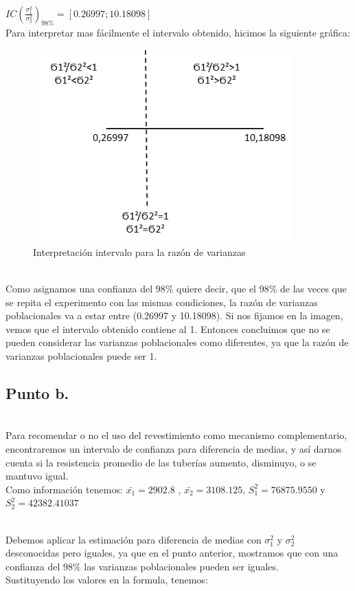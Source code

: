 \documentclass[letterpaper,12pt,onecolumn,titlepage]{article}
\begin{document}
~\\ $IC(\frac{\sigma_1^{2}}{\sigma_2^{2}})_{98\%}=[0.26997 ; 10.18098]$
~\\ Para interpretar mas f\'{a}cilmente el intervalo obtenido, hicimos la siguiente gr\'{a}fica:
\begin{figure}[!h]
    \begin{center}
        \includegraphics[width=10cm]{Figuras/Grafico4.png}
        \caption{Interpretaci\'{o}n intervalo para la raz\'{o}n de varianzas}
        \label{fig:Densidad}
    \end{center}
\end{figure}
~\\ Como asignamos una confianza del $98\%$ quiere decir, que el $98\%$ de las veces que se repita el experimento con las mismas condiciones, la raz\'{o}n de varianzas poblacionales va a estar entre (0.26997 y 10.18098). Si nos fijamos en la imagen, vemos que el intervalo obtenido contiene al 1. Entonces concluimos que no se pueden considerar las varianzas poblacionales como diferentes, ya que la raz\'{o}n de varianzas poblacionales puede ser 1.
\subsection{Punto b.}
~\\ Para recomendar o no el uso del revestimiento como mecanismo complementario, encontraremos un intervalo de confianza para diferencia de medias, y as\'{i} darnos cuenta si la resistencia promedio de las tuber\'{i}as aumento, disminuyo, o se mantuvo igual.
~\\ Como informaci\'{o}n tenemos: $\bar{x_1}=2902.8$ , $\bar{x_2}=3108.125$, $S_{1}^2=76875.9550$ y $S_{2}^2=42382.41037$

~\\ Debemos aplicar la estimaci\'{o}n para diferencia de medias con $\sigma_{1}^2$ y $\sigma_{2}^2$ desconocidas pero iguales, ya que en el punto anterior, mostramos que con una confianza del $98\%$ las varianzas poblacionales pueden ser iguales.
~\\ Sustituyendo los valores en la formula, tenemos:
\end{document}
